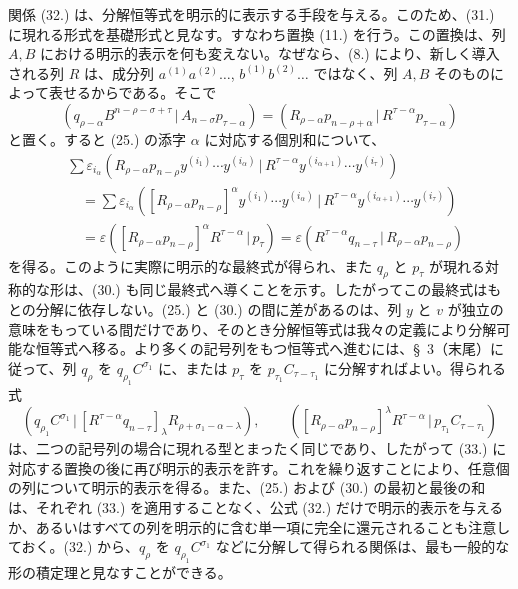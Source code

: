 \documentclass[11pt]{article}
\newcommand{\pair}[2]{(#1\,|\,#2)}
\newcommand{\eps}{\varepsilon}
\begin{document}
関係 (32.) は、分解恒等式を明示的に表示する手段を与える。このため、(31.) に現れる形式を基礎形式と見なす。すなわち置換 (11.) を行う。この置換は、列 $A,B$ における明示的表示を何も変えない。なぜなら、(8.) により、新しく導入される列 $R$ は、成分列 $a^{(1)}a^{(2)}\ldots$, $b^{(1)}b^{(2)}\ldots$ ではなく、列 $A,B$ そのものによって表せるからである。そこで
\begin{equation}
 \pair{q_{\rho-\alpha}B^{n-\rho-\sigma+\tau}}{A_{n-\sigma}p_{\tau-\alpha}}
 =\pair{R_{\rho-\alpha}p_{n-\rho+\alpha}}{R^{\tau-\alpha}p_{\tau-\alpha}}
\tag{33}
\end{equation}
と置く。すると (25.) の添字 $\alpha$ に対応する個別和について、
\begin{equation}
\begin{aligned}
&\sum \eps_{i_\alpha}\pair{R_{\rho-\alpha}p_{n-\rho}y^{(i_1)}\cdots y^{(i_\alpha)}}{R^{\tau-\alpha}y^{(i_{\alpha+1})}\cdots y^{(i_\tau)}}\\
&\quad=\sum \eps_{i_\alpha}\pair{[R_{\rho-\alpha}p_{n-\rho}]^\alpha y^{(i_1)}\cdots y^{(i_\alpha)}}{R^{\tau-\alpha}y^{(i_{\alpha+1})}\cdots y^{(i_\tau)}}\\
&\quad=\eps\pair{[R_{\rho-\alpha}p_{n-\rho}]^\alpha R^{\tau-\alpha}}{p_\tau}
 =\eps\pair{R^{\tau-\alpha}q_{n-\tau}}{R_{\rho-\alpha}p_{n-\rho}}
\end{aligned}
\tag{34}
\end{equation}
を得る。このように実際に明示的な最終式が得られ、また $q_\rho$ と $p_\tau$ が現れる対称的な形は、(30.) も同じ最終式へ導くことを示す。したがってこの最終式はもとの分解に依存しない。(25.) と (30.) の間に差があるのは、列 $y$ と $v$ が独立の意味をもっている間だけであり、そのとき分解恒等式は我々の定義により分解可能な恒等式へ移る。より多くの記号列をもつ恒等式へ進むには、\S\ 3（末尾）に従って、列 $q_\rho$ を $q_{\rho_1}C^{\sigma_1}$ に、または $p_\tau$ を $p_{\tau_1}C_{\tau-\tau_1}$ に分解すればよい。得られる式
\begin{equation}
 \pair{q_{\rho_1}C^{\sigma_1}}{[R^{\tau-\alpha}q_{n-\tau}]_\lambda R_{\rho+\sigma_1-\alpha-\lambda}},
 \qquad
 \pair{[R_{\rho-\alpha}p_{n-\rho}]^\lambda R^{\tau-\alpha}}{p_{\tau_1}C_{\tau-\tau_1}}
\tag{35}
\end{equation}
は、二つの記号列の場合に現れる型とまったく同じであり、したがって (33.) に対応する置換の後に再び明示的表示を許す。これを繰り返すことにより、任意個の列について明示的表示を得る。また、(25.) および (30.) の最初と最後の和は、それぞれ (33.) を適用することなく、公式 (32.) だけで明示的表示を与えるか、あるいはすべての列を明示的に含む単一項に完全に還元されることも注意しておく。(32.) から、$q_\rho$ を $q_{\rho_1}C^{\sigma_1}$ などに分解して得られる関係は、最も一般的な形の積定理と見なすことができる。
\end{document}

